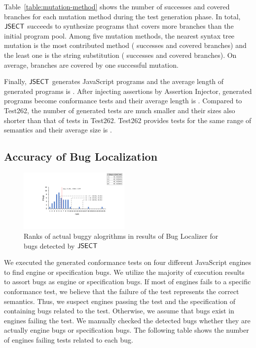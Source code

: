 Table~\ref{table:mutation-method} shows the number of successes and covered
branches for each mutation method during the test generation phase.  In total,
$\text{\sf JSECT}$ succeeds to synthesize  programs that covers 
more branches than the initial program pool.  Among five mutation methods, the
nearest syntax tree mutation is the most contributed method (
successes and  covered branches) and the least one is the string
substitution ( successes and  covered branches).  On average,
 branches are covered by one successful mutation.

Finally, $\text{\sf JSECT}$ generates  JavaScript programs and the average
length of generated programs is .  After injecting assertions by
\textsf{Assertion Injector}, generated programs become conformance tests and
their average length is .  Compared to Test262, the number of
generated tests are much smaller and their sizes also shorter than that of tests
in Test262.  Test262 provides  tests for the same range of
semantics and their average size is .


\subsection{Accuracy of Bug Localization}

\begin{figure}[t]
  \centering
  \includegraphics[width=0.48\textwidth]{img/localize.pdf}
  \caption{Ranks of actual buggy alogrithms in results of \textsf{Bug Localizer}
    for bugs detected by $\text{\sf JSECT}$}
  \label{fig:localize}
  \vspace*{-1em}
\end{figure}

We executed the generated conformance tests on four different JavaScript engines
to find engine or specification bugs.  We utilize the majority of execution
results to assort bugs as engine or specification bugs.  If most of engines
fails to a specific conformance test, we believe that the failure of the test
represents the correct semantics.  Thus, we suspect engines passing the test and
the specification of containing bugs related to the test.  Otherwise, we assume
that bugs exist in engines failing the test.  We manually checked the detected
bugs whether they are actually engine bugs or specification bugs.  The following
table shows the number of engines failing tests related to each bug.

